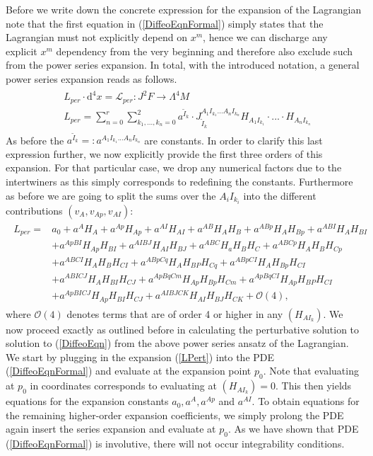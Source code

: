 Before we write down the concrete expression for the expansion of the Lagrangian note that the first equation in (\ref{DiffeoEqnFormal}) simply states that the Lagrangian must not explicitly depend on $x^m$, hence we can discharge any explicit $x^m$ dependency from the very beginning and therefore also exclude such from the power series expansion. In total, with the introduced notation, a general power series expansion reads as follows. 
\begin{align} \label{generalPowerSL}
    \begin{aligned}
    &L_{per} \cdot  \mathrm{d}^4x = \mathcal{L}_{per} : J^2F \longrightarrow \Lambda^4M \\
    &L_{per} = \sum_{n=0}^r \sum_{k_1,...,k_n = 0}^2 a^{\tilde{I}_k} \cdot J_{\tilde{I}_k}^{A_1I_{k_1}...A_nI_{k_n}} H_{A_1I_{k_1}} \cdot ... \cdot H_{A_nI_{k_n}}
    \end{aligned}
\end{align}
%
%
As before the $a^{\tilde{I}_k} =: a^{A_1I_{k_1}...A_nI_{k_n}}$ are constants. 
In order to clarify this last expression further, we now explicitly provide the first three orders of this expansion. For that particular case, we drop any numerical factors due to the intertwiners as this simply corresponds to redefining the constants. Furthermore as before we are going to split the sums over the ${A_iI_{k_i}}$ into the different contributions $(v_A,v_{Ap},v_{AI})$:
\begin{align}\label{LPert}
\begin{aligned}
    L_{per} = &a_0 + a^A H_A + a^{Ap} H_{Ap} + a^{AI}H_{AI} + a^{AB} H_{A}H_{B} + a^{ABp}H_A H_{Bp} + a^{ABI} H_{A} H_{BI}\\
    &+a^{ApBI}H_{Ap} H_{BI} + a^{AIBJ} H_{AI}H_{BJ} + a^{ABC} H_a H_B H_C 
    + a^{ABCp} H_A H_B H_{Cp} \\
    &+a^{ABCI} H_A H_B H_{CI} + a^{ABpCq} H_{A}H_{BP}H_{Cq} + a^{ABpCI} H_A H_{Bp} H_{CI}\\
    &+ a^{ABICJ} H_A H_{BI}H_{CJ} 
    + a^{ApBqCm} H_{Ap} H_{Bp} H_{Cm}+ a^{ApBq CI} H_{Ap} H_{BP} H_{CI}\\
    &+ a^{Ap BI CJ} H_{Ap} H_{BI} H_{CJ} + a^{AIBJCK} H_{AI} H_{BJ} H_{CK} + \mathcal{O}(4),
\end{aligned}
\end{align}
where $\mathcal{O}(4)$ denotes terms that are of order 4 or higher in any $(H_{AI_k})$. We now proceed exactly as outlined before in calculating the perturbative solution to solution to (\ref{DiffeoEqn}) from the above power series ansatz of the Lagrangian. We start by plugging in the expansion (\ref{LPert}) into the PDE (\ref{DiffeoEqnFormal}) and evaluate at the expansion point $p_0$. Note that evaluating at $p_0$ in coordinates corresponds to evaluating at $(H_{AI_k})=0$. This then yields equations for the expansion constants $a_0, a^A, a^{Ap}$ and $a^{AI}$. To obtain equations for the remaining higher-order expansion coefficients, we simply prolong the PDE again insert the series expansion and evaluate at $p_0$. As we have shown that PDE (\ref{DiffeoEqnFormal}) is involutive, there will not occur integrability conditions.

